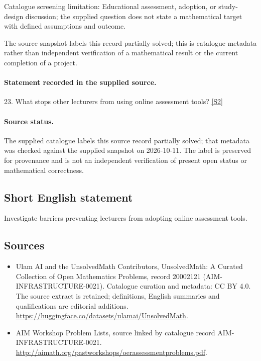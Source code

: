 \documentclass[11pt]{article}
\begin{document}
Catalogue screening limitation: Educational assessment, adoption, or study-design discussion; the supplied question does not state a mathematical target with defined assumptions and outcome.

The source snapshot labels this record partially solved; this is catalogue metadata rather than independent verification of a mathematical result or the current completion of a project.
\paragraph{Statement recorded in the supplied source.}
23. What stops other lecturers from using online assessment tools? \href{http://aimath.org/pastworkshops/oerassessmentproblems.pdf}{[S2]}
\paragraph{Source status.}
The supplied catalogue labels this source record partially solved; that metadata was checked against the supplied snapshot on 2026-10-11. The label is preserved for provenance and is not an independent verification of present open status or mathematical correctness.
\subsection{Short English statement}
Investigate barriers preventing lecturers from adopting online assessment tools.
\subsection{Sources}
\begin{itemize}
\item[S1] Ulam AI and the UnsolvedMath Contributors, UnsolvedMath: A Curated Collection of Open Mathematics Problems, record 20002121 (AIM-INFRASTRUCTURE-0021). Catalogue curation and metadata: CC BY 4.0. The source extract is retained; definitions, English summaries and qualifications are editorial additions.
\url{https://huggingface.co/datasets/ulamai/UnsolvedMath}.
\item[S2] AIM Workshop Problem Lists, source linked by catalogue record AIM-INFRASTRUCTURE-0021.
\url{http://aimath.org/pastworkshops/oerassessmentproblems.pdf}.
\end{itemize}
\end{document}
